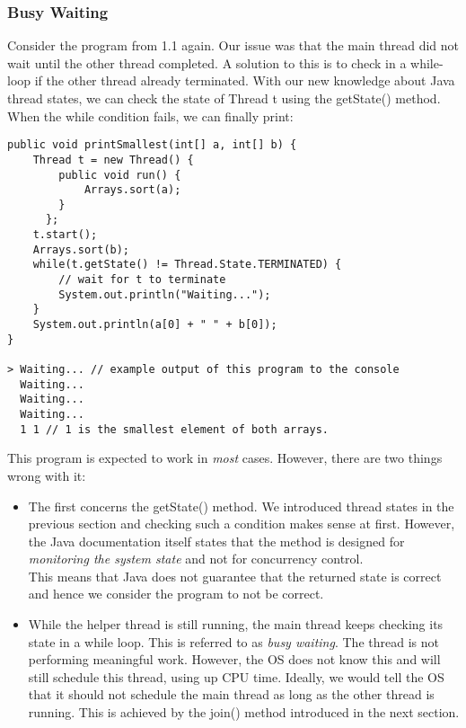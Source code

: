 \documentclass[main.tex]{subfiles}
\begin{document}
\subsubsection{Busy Waiting}
Consider the program from 1.1 again. Our issue was that the main thread did not wait until the other thread completed. A solution to this is to check in a while-loop if the other thread already terminated. With our new knowledge about Java thread states, we can check the state of Thread t using the getState() method. When the while condition fails, we can finally print:
\begin{verbatim}
public void printSmallest(int[] a, int[] b) {
    Thread t = new Thread() {
        public void run() {
            Arrays.sort(a);
        }
      };
    t.start();
    Arrays.sort(b);
    while(t.getState() != Thread.State.TERMINATED) {
        // wait for t to terminate
        System.out.println("Waiting...");
    }
    System.out.println(a[0] + " " + b[0]);
}

> Waiting... // example output of this program to the console
  Waiting...
  Waiting...
  Waiting...
  1 1 // 1 is the smallest element of both arrays.
\end{verbatim}
This program is expected to work in \textit{most} cases. However, there are two things wrong with it:
\begin{itemize}
  \item The first concerns the getState() method. We introduced thread states in the previous section and checking such a condition makes sense at first. However, the Java documentation itself states that the method is designed for \textit{monitoring the system state} and not for concurrency control.\\
  This means that Java does not guarantee that the returned state is correct and hence we consider the program to not be correct. %
  \item While the helper thread is still running, the main thread keeps checking its state in a while loop. This is referred to as \textit{busy waiting}. The thread is not performing meaningful work. However, the OS does not know this and will still schedule this thread, using up CPU time. Ideally, we would tell the OS that it should not schedule the main thread as long as the other thread is running. This is achieved by the join() method introduced in the next section.
\end{itemize}
\end{document}
